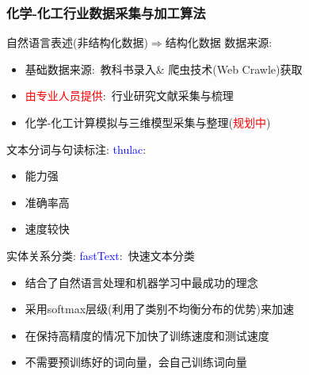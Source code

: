 \begin{frame}[allowframebreaks]
	\frametitle{化学-化工行业数据采集与加工算法}
	自然语言表述(非结构化数据)$\Longrightarrow$结构化数据
	\vskip 2pt
数据来源:
	\begin{itemize}
		\item 基础数据来源:~教科书录入\& 爬虫技术\textrm{(Web Crawle)}获取
		\item \textcolor{red}{由专业人员提供}:~行业研究文献采集与梳理
		\item 化学-化工计算模拟与三维模型采集与整理(\textcolor{red}{规划中}) 
	\end{itemize}

	文本分词与句读标注:\vskip 2pt
	\textcolor{blue}{\textrm{thulac}}:~{\fontsize{7.2pt}{5.2pt}\selectfont{一套中文词法分析工具包，具有中文分词和词性标注功能}}
	\begin{itemize}
		\item 能力强\\
			{\fontsize{6.2pt}{5.2pt}\selectfont{利用目前世界上规模最大的人工分词和词性标注中文语料库(约含5800万字)训练而成，模型标注能力强大}}
		\item 准确率高\\
			{\fontsize{7.2pt}{5.2pt}}
	\item 速度较快\\
		{\fontsize{7.2pt}{5.2pt}}
	\end{itemize}

	实体关系分类:\vskip 2pt
	\textcolor{blue}{\textrm{fastText}}:~快速文本分类
	\begin{itemize}
		\item 结合了自然语言处理和机器学习中最成功的理念\\
			{\fontsize{6.2pt}{5.2pt}}
		\item 采用\textrm{softmax}层级(利用了类别不均衡分布的优势)来加速
		\item 在保持高精度的情况下加快了训练速度和测试速度
		\item 不需要预训练好的词向量，会自己训练词向量
	\end{itemize}


\end{frame}
